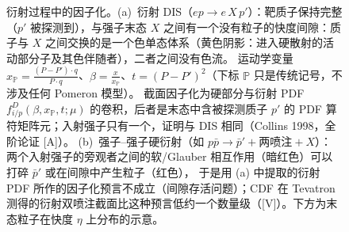 \begin{figure}[htbp]
\caption{衍射过程中的因子化。(a)~衍射 DIS（$e p\to e\,X\,p'$）：靶质子保持完整（$p'$ 被探测到），与强子末态 $X$ 之间有一个没有粒子的快度间隙：质子与 $X$ 之间交换的是一个色单态体系（黄色阴影：进入硬散射的活动部分子及其色伴随者），二者之间没有色流。
运动学变量 $x_{\mathbb P}=\frac{(P-P')\cdot q}{P\cdot q}$、$\beta=\frac{x}{x_{\mathbb P}}$、$t=(P-P')^2$（下标 $\mathbb P$ 只是传统记号，不涉及任何 Pomeron 模型）。
截面因子化为硬部分与衍射 PDF $f^{D}_{i/p}(\beta,x_{\mathbb P},t;\mu)$ 的卷积，后者是末态中含被探测质子 $p'$ 的 PDF 算符矩阵元；入射强子只有一个，证明与 DIS 相同（Collins 1998，全阶论证 [A]）。
(b)~强子--强子硬衍射（如 $p\bar p\to\bar p'+\text{两喷注}+X$）：两个入射强子的旁观者之间的软/Glauber 相互作用（暗红色）可以打碎 $\bar p'$ 或在间隙中产生粒子（红色），
于是用 (a) 中提取的衍射 PDF 所作的因子化预言不成立（间隙存活问题）；CDF 在 Tevatron 测得的衍射双喷注截面比这种预言低约一个数量级（[V]）。下方为末态粒子在快度 $\eta$ 上分布的示意。}
\label{fig:diffraction}
\end{figure}

